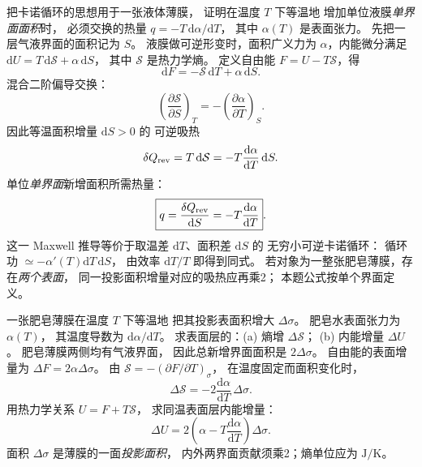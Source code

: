 把卡诺循环的思想用于一张液体薄膜，
证明在温度 $T$ 下等温地
增加单位液膜\emph{单界面面积}时，
必须交换的热量
$q=-T\,\mathrm d\alpha/\mathrm dT$，
其中 $\alpha(T)$ 是表面张力。
\exsolution
先把一层气液界面的面积记为 $S$。
液膜做可逆形变时，面积广义力为
$\alpha$，内能微分满足
$\mathrm dU=T\,\mathrm d\mathcal S+\alpha\,\mathrm dS$，
其中 $\mathcal S$ 是热力学熵。
定义自由能
$F=U-T\mathcal S$，得
\[
\mathrm dF=-\mathcal S\,\mathrm dT+\alpha\,\mathrm dS.
\]
混合二阶偏导交换：
\[
\left(\frac{\partial\mathcal S}{\partial S}\right)_T
=-\left(\frac{\partial\alpha}{\partial T}\right)_S.
\]
因此等温面积增量 $\mathrm dS>0$ 的
可逆吸热
\[
\delta Q_{\rm rev}=T\,\mathrm d\mathcal S
=-T\frac{\mathrm d\alpha}{\mathrm dT}\,\mathrm dS.
\]
单位\emph{单界面}新增面积所需热量：
\[
\boxed{q=\frac{\delta Q_{\rm rev}}{\mathrm dS}
=-T\frac{\mathrm d\alpha}{\mathrm dT}}.
\]
这一 Maxwell 推导等价于取温差
$\mathrm dT$、面积差 $\mathrm dS$ 的
无穷小可逆卡诺循环：
循环功 $\simeq-\alpha'(T)\mathrm dT\,\mathrm dS$，
由效率 $\mathrm dT/T$ 即得到同式。
\excheck 若对象为一整张肥皂薄膜，存在\emph{两个表面}，
同一投影面积增量对应的吸热应再乘2；
本题公式按单个界面定义。

一张肥皂薄膜在温度 $T$ 下等温地
把其投影表面积增大 $\Delta\sigma$。
肥皂水表面张力为 $\alpha(T)$，
其温度导数为 $\mathrm d\alpha/\mathrm dT$。
求表面层的：(a) 熵增 $\Delta\mathcal S$；
(b) 内能增量 $\Delta U$。
\exsolution
肥皂薄膜两侧均有气液界面，
因此总新增界面面积是 $2\Delta\sigma$。
自由能的表面增量为
$\Delta F=2\alpha\Delta\sigma$。
由
$\mathcal S=-(\partial F/\partial T)_\sigma$，
在温度固定而面积变化时，
\[
\boxed{\Delta\mathcal S
=-2\frac{\mathrm d\alpha}{\mathrm dT}
\,\Delta\sigma}.
\]
用热力学关系
$U=F+T\mathcal S$，
求同温表面层内能增量：
\[
\boxed{\Delta U
=2\left(\alpha-
T\frac{\mathrm d\alpha}{\mathrm dT}\right)
\Delta\sigma}.
\]
\excheck 面积 $\Delta\sigma$ 是薄膜的一面\emph{投影面积}，
内外两界面贡献须乘2；熵单位应为 $\mathrm{J/K}$。
